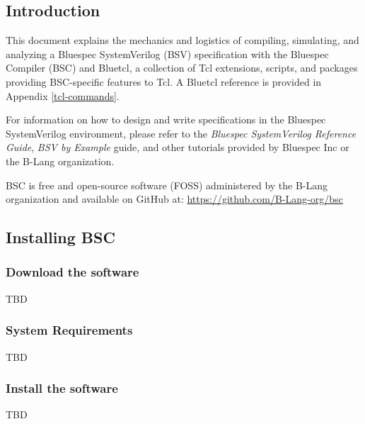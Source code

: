 \documentclass{article}
\begin{document}

\subsection{Introduction}

\label{sec-intro}

This document explains the mechanics and logistics of compiling,
simulating, and analyzing a Bluespec SystemVerilog (BSV)
specification with the Bluespec Compiler (BSC)
and Bluetcl, a collection of Tcl extensions, scripts, and packages
providing BSC-specific features to Tcl.
A Bluetcl reference is provided in Appendix \ref{tcl-commands}.

For information on how to design and write specifications in the
Bluespec SystemVerilog environment, please refer to the
{\em Bluespec SystemVerilog Reference Guide}, {\em BSV by Example} guide,
and other tutorials provided by Bluespec Inc or the B-Lang organization.

BSC is free and open-source software (FOSS) administered by the B-Lang
organization and available on GitHub at:
\url{https://github.com/B-Lang-org/bsc}


\subsection{Installing BSC}
\label{sec-installation}


\subsubsection{Download the software}

TBD


\subsubsection{System Requirements}

TBD


\subsubsection{Install the software}

TBD

\end{document}
